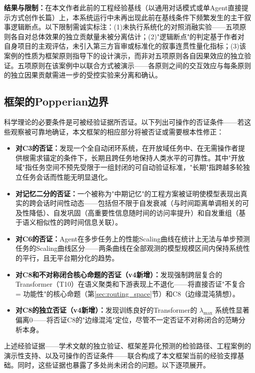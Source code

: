 \documentclass[11pt,a4paper]{article}
\theoremstyle{definition}
\begin{document}
\textbf{结果与限制：}在本文作者此前的工程经验基线（以通用对话模式或单Agent直接提示方式创作长篇）上，本系统运行中未再出现此前在基线条件下频繁发生的主干叙事逻辑断点。以下限制需诚实标注：(1)未执行系统化的对照消融实验——五项原则各自对总体效果的独立贡献量未被分离估计；(2)"逻辑断点"的判定基于作者对自身项目的主观评估，未引入第三方盲审或标准化的叙事连贯性量化指标；(3)该案例的性质为框架原则指导下的设计演示，而非对五项原则各自因果效应的独立验证。五项原则在该案例中以联合方式被演示——各原则之间的交互效应与每条原则的独立因果贡献需进一步的受控实验来分离和确认。

\subsection{框架的Popperian边界}

科学理论的必要条件是可被经验证据所否证。以下列出可操作的否证条件——若这些观察被可靠地确证，本文框架的相应部分将被否证或需要根本性修正：

\begin{itemize}[leftmargin=*,itemsep=0.3em]
    \item \textbf{对C3的否证：}发现一个全自动闭环系统，在开放域任务中、在无需操作者提供根需求锚定的条件下，长期且跨任务地保持人类水平的可靠性。其中"开放域"指任务空间不预先受限于一组封闭的可自动验证标准，"长期"指跨越多轮独立任务会话而性能无明显退化。
    \item \textbf{对记忆二分的否证：}一个被称为"中期记忆"的工程方案被证明使模型表现出真实的跨会话时间性动态——包括但不限于自发衰减（与时间距离单调相关的可及性降低）、自发巩固（高重要性信息随时间的访问率提升）和自发重组（基于语义相似性的跨时间信息关联）。
    \item \textbf{对C6的否证：}Agent在多步任务上的性能Scaling曲线在统计上无法与单步预测任务的Scaling曲线区分——两条曲线在全部观测的模型规模区间内保持系统性的平行，且无平台期分化的趋势。
    \item \textbf{对C8和不对称闭合核心命题的否证（v4新增）：}发现强制跨层复合的Transformer（T10）在语义聚类和下游表现上不退化——将直接否证"不复合 = 功能性"的核心命题（第\ref{sec:routing_space}节）和C8（边缘混沌猜想）。
    \item \textbf{对C8的独立否证（v4新增）：}发现训练良好的Transformer的 $\lambda_{\max}$ 系统性显著偏离0——将否证C8的"边缘混沌"定位，尽管不一定否证不对称闭合的范畴分析本身。
\end{itemize}

上述经验证据——学术文献的独立验证、框架差异化预测的检验路径、工程案例的演示性支持、以及可操作的否证条件——联合构成了本文框架当前的经验支撑基础。同时，这些证据也暴露了多处尚未闭合的问题。以下逐项展开。
\end{document}
